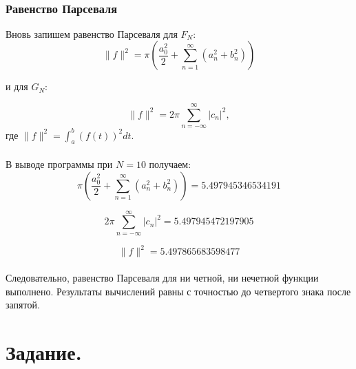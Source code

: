 \documentclass[a5paper, 10pt]{article}
\theoremstyle{definition}
\theoremstyle{plain}
\theoremstyle{remark}
\begin{document}
\newpage
\,
\newpage
\,

\subsubsection{Равенство Парсеваля}

Вновь запишем равенство Парсеваля для $F_N$:
\begin{equation}
\| f \|^2 = \pi \left( \frac{a_0^2}{2} + \sum \limits_{n=1}^{\infty} \left( a_n^2 + b_n^2 \right) \right)
\end{equation}

и для $G_N$:

\begin{equation}
\| f \|^2 = 2 \pi \sum \limits_{n = -\infty}^{\infty} |c_n |^2,
\end{equation}
где $\| f \|^2 = \int_a^b (f(t))^2 dt $.
\\
\\
 В выводе программы при $N=10$ получаем:
\begin{equation*}
 \pi \left( \frac{a_0^2}{2} + \sum \limits_{n=1}^{\infty} \left( a_n^2 + b_n^2 \right) \right) = 5.497945346534191
\end{equation*}

\begin{equation*}
2 \pi \sum \limits_{n = -\infty}^{\infty} |c_n |^2 = 5.497945472197905
\end{equation*}

\begin{equation*}
\| f \|^2  = 5.497865683598477
\end{equation*}
\\
Следовательно, равенство Парсеваля для ни четной, ни нечетной функции выполнено. Результаты вычислений равны с точностью до четвертого знака после запятой.



\newpage
\section{Задание.}
\end{document}
